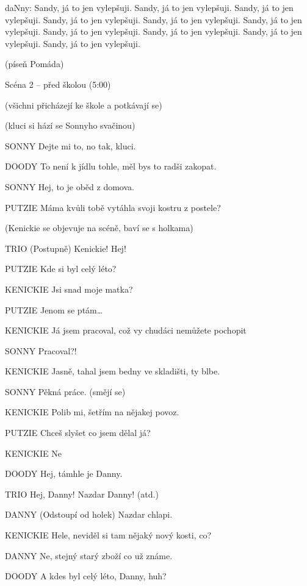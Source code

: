 \rep daNny: Sandy, já to jen vylepšuji. Sandy, já to jen vylepšuji. Sandy, já to jen vylepšuji. Sandy, já to jen vylepšuji. Sandy, já to jen vylepšuji. Sandy, já to jen vylepšuji. Sandy, já to jen vylepšuji. Sandy, já to jen vylepšuji. Sandy, já to jen vylepšuji. Sandy, já to jen vylepšuji. 


\bye

(píseň Pomáda)

Scéna 2 – před školou (5:00)

(všichni přicházejí ke škole a potkávají se)

(kluci si hází se Sonnyho svačinou)

SONNY        Dejte mi to, no tak, kluci. 

DOODY        To není k jídlu tohle, měl bys to radši zakopat.

SONNY        Hej, to je oběd z domova.

PUTZIE        Máma kvůli tobě vytáhla svoji kostru z postele?

(Kenickie se objevuje na scéně, baví se s holkama)

TRIO        (Postupně) Kenickie! Hej!

PUTZIE        Kde si byl celý léto?

KENICKIE        Jsi snad moje matka?

PUTZIE        Jenom se ptám…

KENICKIE        Já jsem pracoval, což vy chudáci nemůžete pochopit

SONNY        Pracoval?!

KENICKIE                Jasně, tahal jsem bedny ve skladišti, ty blbe.

SONNY                Pěkná práce. (smějí se)

KENICKIE                Polib mi, šetřím na nějakej povoz.

PUTZIE                Chceš slyšet co jsem dělal já?

KENICKIE                 Ne

DOODY                Hej, támhle je Danny.

TRIO                Hej, Danny! Nazdar Danny! (atd.)

DANNY                (Odstoupí od holek) Nazdar chlapi. 

KENICKIE                Hele, neviděl si tam nějaký nový kosti, co?

DANNY                Ne, stejný starý zboží co už známe.

DOODY                A kdes byl celý léto, Danny, huh?

